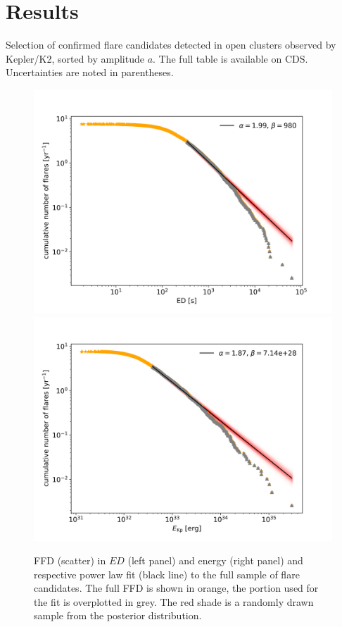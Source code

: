 \documentclass{aa}
\begin{document}
\section{Results}
\begin{table}
\caption{Selection of confirmed flare candidates detected in open clusters observed by Kepler/K2, sorted by amplitude $a$. The full table is available on CDS.  Uncertainties are noted in parentheses.}
\label{tab:flares}
\centering
\footnotesize

\end{table}
\begin{figure}
    \centering
    \includegraphics[width=0.49\hsize]{pics/FFDs/full_sample_ffd_ED_wheatland.png}
    \hspace{.01cm}
    \includegraphics[width=0.49\hsize]{pics/FFDs/full_sample_ffd_energy_wheatland.png}
    \caption{FFD (scatter) in $ED$ (left panel) and energy (right panel) and respective power law fit (black line) to the full sample of flare candidates. The full FFD is shown in orange, the portion used for the fit is overplotted in grey. The red shade is a randomly drawn sample from the posterior distribution.}      
    \label{fig:powerlawfit_full}
\end{figure}
\end{document}
